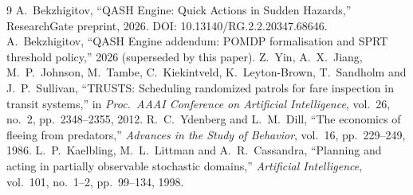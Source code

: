 \documentclass[11pt,a4paper]{article}
\begin{document}
\begin{thebibliography}{9}
 A.\ Bekzhigitov, ``QASH Engine: Quick Actions in Sudden Hazards,'' ResearchGate preprint, 2026. DOI: 10.13140/RG.2.2.20347.68646.
 A.\ Bekzhigitov, ``QASH Engine addendum: POMDP formalisation and SPRT threshold policy,'' 2026 (superseded by this paper).
 Z.\ Yin, A.\ X.\ Jiang, M.\ P.\ Johnson, M.\ Tambe, C.\ Kiekintveld, K.\ Leyton-Brown, T.\ Sandholm and J.\ P.\ Sullivan, ``TRUSTS: Scheduling randomized patrols for fare inspection in transit systems,'' in \emph{Proc.\ AAAI Conference on Artificial Intelligence}, vol.~26, no.~2, pp.~2348--2355, 2012.
 R.\ C.\ Ydenberg and L.\ M.\ Dill, ``The economics of fleeing from predators,'' \emph{Advances in the Study of Behavior}, vol.~16, pp.~229--249, 1986.
 L.\ P.\ Kaelbling, M.\ L.\ Littman and A.\ R.\ Cassandra, ``Planning and acting in partially observable stochastic domains,'' \emph{Artificial Intelligence}, vol.~101, no.~1--2, pp.~99--134, 1998.
\end{thebibliography}
\end{document}
